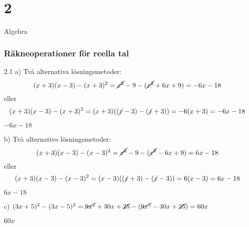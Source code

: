 \chapter{2}{Algebra}
\subsection*{Räkneoperationer för reella tal}

\begin{task}{2.1 a)}
	Två alternativa lösningsmetoder:
	\[(x+3)(x-3)-(x+3)^2=\cancel{x^2}-9-(\cancel{x^2}+6x+9)=-6x-18\]
	eller
	\[(x+3)(x-3)-(x+3)^2=(x+3)((\cancel{x}-3)-(\cancel{x}+3))=-6(x+3)=-6x-18\]
	
	\ans $-6x-18$
\end{task}

\begin{task}{b)}
	Två alternativa lösningsmetoder:
	\[(x+3)(x-3)-(x-3)^2=\cancel{x^2}-9-(\cancel{x^2}-6x+9)=6x-18\]
	eller
	\[(x+3)(x-3)-(x-3)^2=(x-3)((\cancel{x}+3)-(\cancel{x}-3))=6(x-3)=6x-18\]
	
	\ans $6x-18$
\end{task}

\begin{task}{c)}
	$(3x+5)^2-(3x-5)^2=\cancel{9x^2}+30x+\cancel{25}-(\cancel{9x^2}-30x+\cancel{25})=60x$
	
	\ans $60x$
\end{task}